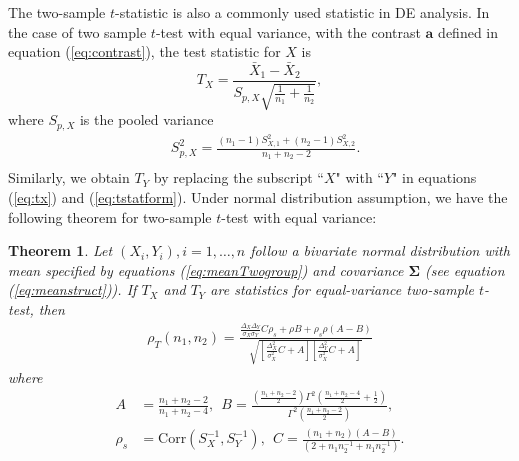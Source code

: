 \documentclass[review]{elsarticle}
\newtheorem{theorem}{Theorem}       %
\newcommand{\cor}{\text{Corr}}
\begin{document}
The two-sample $t$-statistic is also a commonly used statistic in DE 
analysis. In the case of two sample $t$-test with equal variance, with the contrast $\bm a$ 
defined in equation (\ref{eq:contrast}), the test statistic for $X$ is 
\begin{equation}\label{eq:tx}
T_X= \frac{\bar{X}_1- \bar{X}_2}{S_{p, X}\sqrt{\frac{1}{n_1} + \frac{1}{n_2}}},
\end{equation}
where $S_{p, X}$ is the pooled variance
\begin{equation}\label{eq:tstatform}
\begin{aligned}
&S_{p, X}^2 = \frac{(n_1-1)S_{X, 1}^2 + (n_2 -1)S_{X,2}^2}{n_1 + n_2 -2}. \\
\end{aligned}
\end{equation}
Similarly, we obtain $T_Y$ by replacing the subscript ``$X$" with ``$Y$" in equations (\ref{eq:tx}) 
and (\ref{eq:tstatform}). Under normal distribution assumption, we have the following theorem for 
two-sample $t$-test with equal variance:
\begin{theorem}\label{thm:tstat}
	Let $(X_i, Y_i), i = 1, \ldots, n$ follow a bivariate normal distribution with mean 
	specified by equations (\ref{eq:meanTwogroup}) and covariance $\bm \Sigma$ (see equation 
	(\ref{eq:meanstruct})). If $T_X$ and $T_Y$ are statistics for equal-variance two-sample 
	$t$-test, then 
	\begin{equation}\label{eq:ttestcor}
	\begin{aligned}
	\rho_T(n_1, n_2)=   
	\frac{\frac{\Delta_X\Delta_Y}{\sigma_X\sigma_Y}C \rho_{s}+ \rho B
		+ \rho_{s}\rho(A-B)}{\sqrt{\left[ \frac{\Delta_X^2}{\sigma_X^2}C + 
			A\right]\left[\frac{\Delta_Y^2}{\sigma_X^2}C +   A\right]}}
	\end{aligned}
	\end{equation}
	where 
	\begin{equation}\label{eq:AandB}
	\begin{aligned}
	A & = \frac{n_1 + n_2-2}{n_1 + n_2-4}, ~~B =
	\frac{(\frac{n_1 + n_2 -2}{2})\Gamma^2(\frac{n_1 + n_2 -4}{2} + 
		\frac{1}{2})}{\Gamma^2(\frac{n_1+ n_2 -2}{2})}, \\
	\rho_s & = \cor(S_X^{-1}, S_Y^{-1}), ~~ 
	C = \frac{(n_1 + n_2)(A-B)}{(2 + n_1n_2^{-1} + n_1n_2^{-1})}.
	\end{aligned}
	\end{equation}	 
\end{theorem}
\end{document}
